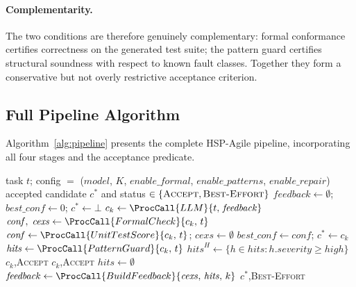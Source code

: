 \paragraph{Complementarity.}
The two conditions are therefore genuinely complementary: formal conformance
certifies correctness on the generated test suite; the pattern guard certifies
structural soundness with respect to known fault classes.  Together they form
a conservative but not overly restrictive acceptance criterion.

\subsection{Full Pipeline Algorithm}
\label{subsec:method:full-alg}

Algorithm~\ref{alg:pipeline} presents the complete HSP-Agile pipeline,
incorporating all four stages and the acceptance predicate.

\begin{algorithm}[t]
\caption{HSP-Agile Candidate Synthesis and Fault Prevention}
\label{alg:pipeline}
\begin{algorithmic}[1]
\Require task $t$; config $=$ ($\mathit{model}$, $K$, $\mathit{enable\_formal}$,
         $\mathit{enable\_patterns}$, $\mathit{enable\_repair}$)
\Ensure accepted candidate $c^*$ and status $\in \{\textsc{Accept},
        \textsc{Best-Effort}\}$
\State $\mathit{feedback} \leftarrow \emptyset$;\quad
       $\mathit{best\_conf} \leftarrow 0$;\quad
       $c^* \leftarrow \bot$
  \State $c_k \leftarrow \ProcCall{LLM}{t,\, \mathit{feedback}}$
    \State $\mathit{conf},\;\mathit{cexs} \leftarrow
           \ProcCall{FormalCheck}{c_k,\, t}$
  \Else
    \State $\mathit{conf} \leftarrow \ProcCall{UnitTestScore}{c_k,\, t}$;\quad
           $\mathit{cexs} \leftarrow \emptyset$
  \EndIf
    \State $\mathit{best\_conf} \leftarrow \mathit{conf}$;\quad
           $c^* \leftarrow c_k$
  \EndIf
      \State $\mathit{hits} \leftarrow \ProcCall{PatternGuard}{c_k,\, t}$
      \State $\mathit{hits}^H \leftarrow
             \{h \in \mathit{hits} : h.\mathit{severity} \ge \mathit{high}\}$
        \State \Return $c_k$,\enspace \textsc{Accept}
      \EndIf
    \Else
      \State \Return $c_k$,\enspace \textsc{Accept}
    \EndIf
  \Else
    \State $\mathit{hits} \leftarrow \emptyset$
  \EndIf
    \State $\mathit{feedback} \leftarrow
           \ProcCall{BuildFeedback}{\mathit{cexs},\,\mathit{hits},\,k}$
  \EndIf
\EndFor
\State \Return $c^*$,\enspace \textsc{Best-Effort}
\end{algorithmic}
\end{algorithm}

